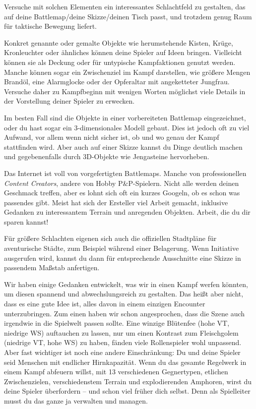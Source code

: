 Versuche mit solchen Elementen ein interessantes Schlachtfeld zu gestalten, das auf deine Battlemap/deine Skizze/deinen Tisch passt, und trotzdem genug Raum für taktische Bewegung liefert. 

\neuespalte

Konkret genannte oder gemalte Objekte wie herumstehende Kisten, Krüge, Kronleuchter oder ähnliches können deine Spieler auf Ideen bringen.
 Vielleicht können sie als Deckung oder für untypische Kampfaktionen genutzt werden.
 Manche können sogar ein Zwischenziel im Kampf darstellen, wie größere Mengen Brandöl, eine Alarmglocke oder der Opferaltar mit angeketteter Jungfrau.
 Versuche daher zu Kampfbeginn mit wenigen Worten möglichst viele Details in der Vorstellung deiner Spieler zu erwecken.
 
 Im besten Fall sind die Objekte in einer vorbereiteten Battlemap eingezeichnet, oder du hast sogar ein 3-dimensionales Modell gebaut. Dies ist jedoch oft zu viel Aufwand, vor allem wenn nicht sicher ist, ob und wo genau der Kampf stattfinden wird. Aber auch auf einer Skizze kannst du Dinge deutlich machen und gegebenenfalls durch 3D-Objekte wie Jengasteine hervorheben.

Das Internet ist voll von vorgefertigten Battlemaps. Manche von professionellen \textit{Content Creators}, andere von Hobby P\&P-Spielern. Nicht alle werden deinen Geschmack treffen, aber es lohnt sich oft ein kurzes Googeln, ob es schon was passendes gibt.
Meist hat sich der Ersteller viel Arbeit gemacht, inklusive Gedanken zu interessantem Terrain und anregenden Objekten.
Arbeit, die du dir sparen kannst!

Für größere Schlachten eigenen sich auch die offiziellen Stadtpläne für aventurische Städte, zum Beispiel während einer Belagerung.
Wenn Initiative ausgerufen wird, kannst du dann für entsprechende Ausschnitte eine Skizze in passendem Maßstab anfertigen.

\spaltenende

\spaltenanfang
Wir haben einige Gedanken entwickelt, was wir in einen Kampf werfen könnten, um diesen spannend und abwechslungsreich zu gestalten.
Das heißt aber nicht, dass es eine gute Idee ist, alles davon in einem einzigen Encounter unterzubringen.
Zum einen haben wir schon angesprochen, dass die Szene auch irgendwie in die Spielwelt passen sollte.
Eine winzige Blütenfee (hohe VT, niedrige WS) auftauchen zu lassen, nur um einen Kontrast zum Fleischgolem (niedrige VT, hohe WS) zu haben, fänden viele Rollenspieler wohl unpassend.
Aber fast wichtiger ist noch eine andere Einschränkung:
Du und deine Spieler seid Menschen mit endlicher Hirnkapazität. Wenn du das gesamte Regelwerk in einem Kampf abfeuern willst, mit 13 verschiedenen Gegnertypen, etlichen Zwischenzielen, verschiedenstem Terrain und explodierenden Amphoren, wirst du deine Spieler überfordern -- und schon viel früher dich selbst.
Denn als Spielleiter musst du das ganze ja verwalten und managen. 

